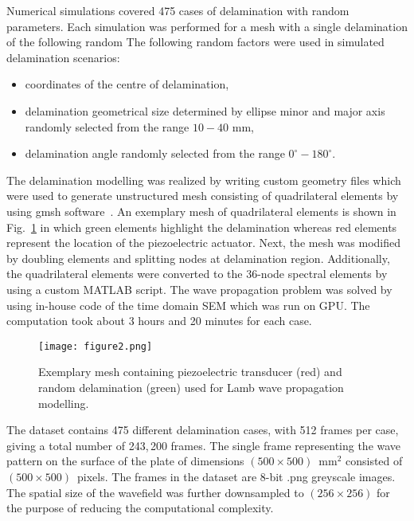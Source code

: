 Numerical simulations covered 475 cases of delamination with random parameters. 
Each simulation was performed for a mesh with a single delamination of the following random 
The following random factors were used in simulated delamination scenarios:
\begin{itemize}
	\item coordinates of the centre of delamination,
	\item delamination geometrical size	determined by ellipse minor and major axis randomly selected from the range $10-40$ mm,
	\item delamination angle randomly selected from the range $ 0^{\circ}-180^{\circ}$.
	
\end{itemize}
The delamination modelling was realized by writing custom geometry files which were used to generate unstructured mesh consisting of quadrilateral elements by using gmsh software~\cite{Geuzaine2009}.
An exemplary mesh of quadrilateral elements is shown in Fig.~\ref{fig:random_delam_mesh} in which green elements highlight the delamination whereas red elements represent the location of the piezoelectric actuator.
Next, the mesh was modified by doubling elements and splitting nodes at delamination region.
Additionally, the quadrilateral elements were converted to the 36-node spectral elements by using a custom MATLAB script.
The wave propagation problem was solved by using in-house code of the time domain SEM which was run on GPU.
The computation took about 3 hours and 20 minutes for each case.
\begin{figure} [h!]
	\begin{center}
		\texttt{[image: figure2.png]}
	\end{center}
	\caption{Exemplary mesh containing piezoelectric transducer (red) and random delamination (green) used for Lamb wave propagation modelling.} 
	\label{fig:random_delam_mesh}
\end{figure}
The dataset contains 475 different delamination cases, with 512 frames per case, giving a total number of 243,\,200 frames. 
The single frame representing the wave pattern on the surface of the plate of dimensions \((500\times500)\)~mm\(^{2}\) consisted of \((500\times500)\)~pixels.
The frames in the dataset are 8-bit .png greyscale images.
The spatial size of the wavefield was further downsampled to \((256\times256)\) for the purpose of 
reducing the computational complexity.

